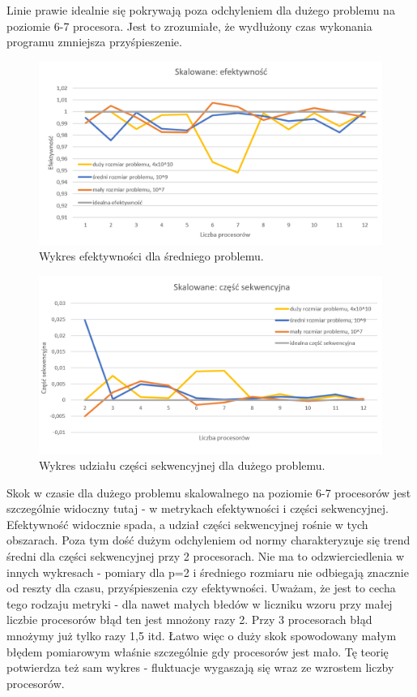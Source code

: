 \documentclass[10pt,english, openany]{book}
\begin{document}
Linie prawie idealnie się pokrywają poza odchyleniem dla dużego problemu na poziomie 6-7 procesora. Jest to zrozumiałe, że wydłużony czas wykonania programu zmniejsza przyśpieszenie.

\begin{figure}[H]
\centering
\includegraphics[scale=0.9]{pics/Sk_efekt.png}
\caption{Wykres efektywności dla średniego problemu.}
\end{figure}

\begin{figure}[H]
\centering
\includegraphics[scale=0.9]{pics/Sk_sekw.png}
\caption{Wykres udziału części sekwencyjnej dla dużego problemu.}
\end{figure}

Skok w czasie dla dużego problemu skalowalnego na poziomie 6-7 procesorów jest szczególnie widoczny tutaj - w metrykach efektywności i części sekwencyjnej. Efektywność widocznie spada, a udział części sekwencyjnej rośnie w tych obszarach. Poza tym dość dużym odchyleniem od normy charakteryzuje się trend średni dla części sekwencyjnej przy 2 procesorach. Nie ma to odzwierciedlenia w innych wykresach - pomiary dla p=2 i średniego rozmiaru nie odbiegają znacznie od reszty dla czasu, przyśpieszenia czy efektywności. Uważam, że jest to cecha tego rodzaju metryki - dla nawet małych błedów w liczniku wzoru przy małej liczbie procesorów błąd ten jest mnożony razy 2. Przy 3 procesorach błąd mnożymy już tylko razy 1,5 itd. Łatwo więc o duży skok spowodowany małym błędem pomiarowym właśnie szczególnie gdy procesorów jest mało. Tę teorię potwierdza też sam wykres - fluktuacje wygaszają się wraz ze wzrostem liczby procesorów.
\end{document}
